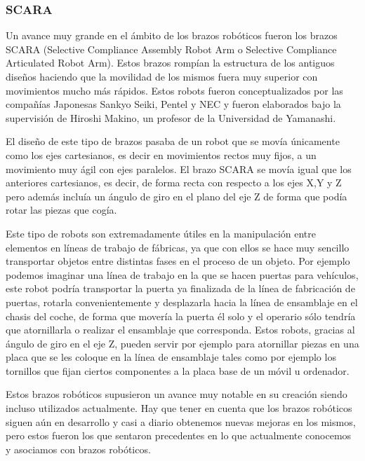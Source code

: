 \subsubsection{SCARA}
Un avance muy grande en el ámbito de los brazos robóticos fueron los brazos SCARA (Selective Compliance Assembly Robot Arm o Selective Compliance Articulated Robot Arm). Estos brazos rompían la estructura de los antiguos diseños haciendo que la movilidad de los mismos fuera muy superior con movimientos mucho más rápidos. Estos robots fueron conceptualizados por las compañías Japonesas Sankyo Seiki, Pentel y NEC y fueron elaborados bajo la supervisión de Hiroshi Makino, un profesor de la Universidad de Yamanashi.

El diseño de este tipo de brazos pasaba de un robot que se movía únicamente como los ejes cartesianos, es decir en movimientos rectos muy fijos, a un movimiento muy ágil con ejes paralelos. El brazo SCARA se movía igual que los anteriores cartesianos, es decir, de forma recta con respecto a los ejes X,Y y Z pero además incluía un ángulo de giro en el plano del eje Z de forma que podía rotar las piezas que cogía.

Este tipo de robots son extremadamente útiles en la manipulación entre elementos en líneas de trabajo de fábricas, ya que con ellos se hace muy sencillo transportar objetos entre distintas fases en el proceso de un objeto. Por ejemplo podemos imaginar una línea de trabajo en la que se hacen puertas para vehículos, este robot podría transportar la puerta ya finalizada de la línea de fabricación de puertas, rotarla convenientemente y desplazarla hacia la línea de ensamblaje en el chasis del coche, de forma que movería la puerta él solo y el operario sólo tendría que atornillarla o realizar el ensamblaje que corresponda. Estos robots, gracias al ángulo de giro en el eje Z, pueden servir por ejemplo para atornillar piezas en una placa que se les coloque en la línea de ensamblaje tales como por ejemplo los tornillos que fijan ciertos componentes a la placa base de un móvil u ordenador.

Estos brazos robóticos supusieron un avance muy notable en su creación siendo incluso utilizados actualmente. Hay que tener en cuenta que los brazos robóticos siguen aún en desarrollo y casi a diario obtenemos nuevas mejoras en los mismos, pero estos fueron los que sentaron precedentes en lo que actualmente conocemos y asociamos con brazos robóticos.
